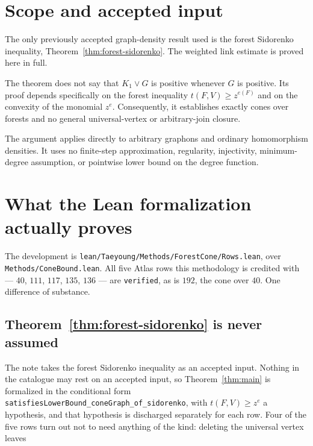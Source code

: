 \documentclass[11pt]{article}
\newcommand{\join}{\mathbin{\vee}}
\begin{document}
\section{Scope and accepted input}

The only previously accepted graph-density result used is the forest
Sidorenko inequality, Theorem~\ref{thm:forest-sidorenko}.  The weighted
link estimate is proved here in full.

The theorem does not say that $K_1\join G$ is positive whenever $G$ is
positive.  Its proof depends specifically on the forest inequality
$t(F,V)\geq z^{e(F)}$ and on the convexity of the monomial $z^e$.
Consequently, it establishes exactly cones over forests and no general
universal-vertex or arbitrary-join closure.

The argument applies directly to arbitrary graphons and ordinary
homomorphism densities.  It uses no finite-step approximation,
regularity, injectivity, minimum-degree assumption, or pointwise lower
bound on the degree function.

\appendix
\section{What the Lean formalization actually proves}

The development is \texttt{lean/Taeyoung/Methods/ForestCone/Rows.lean}, over
\texttt{Methods/ConeBound.lean}.  All five Atlas rows this methodology is
credited with --- $40$, $111$, $117$, $135$, $136$ --- are
\texttt{verified}, as is $192$, the cone over $40$.  One difference of
substance.

\subsection*{Theorem~\ref{thm:forest-sidorenko} is never assumed}

The note takes the forest Sidorenko inequality as an accepted input.  Nothing
in the catalogue may rest on an accepted input, so Theorem~\ref{thm:main} is
formalized in the conditional form
\texttt{satisfiesLowerBound\_coneGraph\_of\_sidorenko}, with $t(F,V)\geq z^e$
a hypothesis, and that hypothesis is discharged separately for each row.  Four
of the five rows turn out not to need anything of the kind: deleting the
universal vertex leaves
\end{document}
